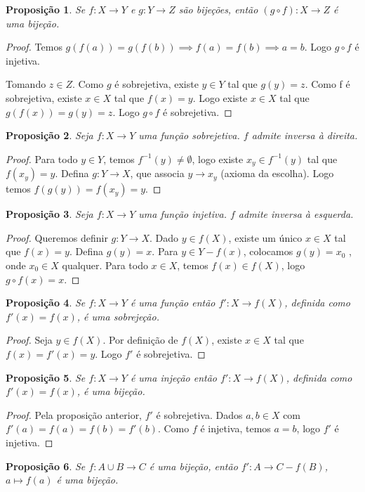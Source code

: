 \documentclass{article}
\theoremstyle{plain}
\newtheorem{prop}{Proposição}[section]
\theoremstyle{definition}
\theoremstyle{remark}
\begin{document}
\begin{prop}
	Se $f:X\to Y$ e $g:Y\to Z$ são bijeções, então $(g \circ f): X\to Z$ é uma bijeção.
\end{prop}
\begin{proof}
	Temos $g(f(a)) = g(f(b)) \implies f(a) = f(b) \implies a = b$. Logo $g \circ f$ é injetiva.

	Tomando $z \in Z$. Como $g$ é sobrejetiva, existe $y\in Y$ tal que $g(y) = z$. Como f é sobrejetiva, existe $x\in X$ tal que $f(x) = y$. Logo existe $x\in X$ tal que  $g(f(x)) = g(y) = z$. Logo $g\circ f$ é sobrejetiva.
\end{proof}
\begin{prop}
	Seja $f:X \to Y$ uma função sobrejetiva. $f$ admite inversa à direita.
\end{prop}
\begin{proof}
	Para todo $y\in Y$, temos $f^{-1}(y) \neq \emptyset$, logo existe $x_y \in f^{-1}(y)$ tal que $f(x_y) = y$. Defina $g: Y\to X$, que associa $y\to x_y$ (axioma da escolha). Logo temos $f(g(y)) = f(x_y) = y$.
\end{proof}
\begin{prop}
	Seja $f:X \to Y$ uma função injetiva. $f$ admite inversa à esquerda.
\end{prop}
\begin{proof}
	Queremos definir $g: Y \to X$. Dado $y \in f(X)$, existe um único $x \in X$ tal que $f(x) = y$. Defina $g(y) = x$. Para $y\in Y - f(x)$, colocamos $g(y) = x_0$ , onde $x_0 \in X$ qualquer. Para todo $x\in X$, temos $f(x) \in f(X)$, logo $g\circ f (x) = x$. 
\end{proof}
\begin{prop}
	Se $f:X\to Y$ é uma função  então $f': X\to f(X)$, definida como $f'(x) = f(x)$, é uma sobrejeção.
\end{prop}
\begin{proof}
	Seja $y\in f(X)$. Por definição de $f(X)$, existe $x\in X$ tal que $f(x) = f'(x) =  y$. Logo $f'$ é sobrejetiva.
\end{proof}
\begin{prop}
	Se $f:X\to Y$ é uma injeção então $f': X\to f(X)$, definida como $f'(x) = f(x)$, é uma bijeção.
\end{prop}
\begin{proof}
	Pela proposição anterior, $f'$ é sobrejetiva.
	Dados $a,b\in X$ com $f'(a)  = f(a) = f(b) =  f'(b)$. Como $f$ é injetiva, temos $a = b$, logo $f'$ é injetiva.
\end{proof}
\begin{prop}
	\label{propbijecao}
	Se $f: A\cup B \to C$ é uma bijeção, então $f': A \to C-f(B)$, $a\mapsto f(a)$ é uma bijeção.
\end{prop}
\end{document}
